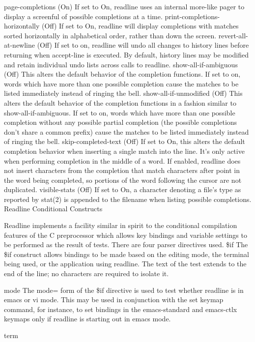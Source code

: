 page-completions (On)
If set to On, readline uses an internal more-like pager to display a screenful of possible completions at a time.
print-completions-horizontally (Off)
If set to On, readline will display completions with matches sorted horizontally in alphabetical order, rather than down the screen.
revert-all-at-newline (Off)
If set to on, readline will undo all changes to history lines before returning when accept-line is executed. By default, history lines may be modified and retain individual undo lists across calls to readline.
show-all-if-ambiguous (Off)
This alters the default behavior of the completion functions. If set to on, words which have more than one possible completion cause the matches to be listed immediately instead of ringing the bell.
show-all-if-unmodified (Off)
This alters the default behavior of the completion functions in a fashion similar to show-all-if-ambiguous. If set to on, words which have more than one possible completion without any possible partial completion (the possible completions don't share a common prefix) cause the matches to be listed immediately instead of ringing the bell.
skip-completed-text (Off)
If set to On, this alters the default completion behavior when inserting a single match into the line. It's only active when performing completion in the middle of a word. If enabled, readline does not insert characters from the completion that match characters after point in the word being completed, so portions of the word following the cursor are not duplicated.
visible-stats (Off)
If set to On, a character denoting a file's type as reported by stat(2) is appended to the filename when listing possible completions.
Readline Conditional Constructs

Readline implements a facility similar in spirit to the conditional compilation features of the C preprocessor which allows key bindings and variable settings to be performed as the result of tests. There are four parser directives used.
\$if
The \$if construct allows bindings to be made based on the editing mode, the terminal being used, or the application using readline. The text of the test extends to the end of the line; no characters are required to isolate it.

mode
The mode= form of the \$if directive is used to test whether readline is in emacs or vi mode. This may be used in conjunction with the set keymap command, for instance, to set bindings in the emacs-standard and emacs-ctlx keymaps only if readline is starting out in emacs mode.

term

